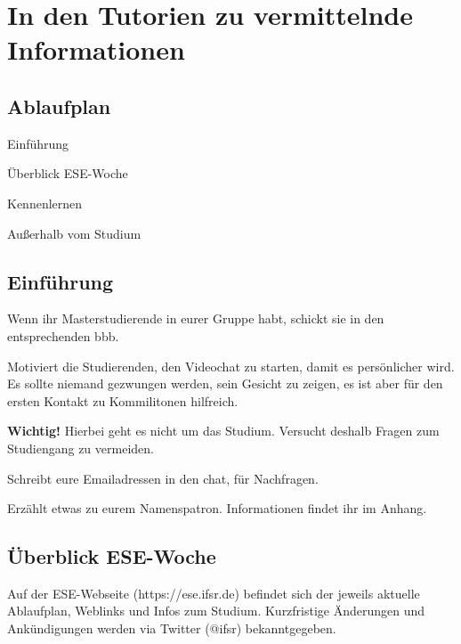 \documentclass[a4paper,12pt]{scrreprt}
\begin{document}
\chapter{In den Tutorien zu vermittelnde Informationen}

\section{Ablaufplan}

\begin{itemize*}
    \item Einführung
    \item Überblick ESE-Woche
    \item Kennenlernen
    \item Außerhalb vom Studium
\end{itemize*}

\section{Einführung}
\begin{itemize*}
    \item Wenn ihr Masterstudierende in eurer Gruppe habt, schickt sie in den entsprechenden bbb.
    \item Motiviert die Studierenden, den Videochat zu starten, damit es persönlicher wird. Es sollte niemand gezwungen werden, sein Gesicht zu zeigen, es ist aber für den ersten Kontakt zu Kommilitonen hilfreich.
    \item \textbf{Wichtig!} Hierbei geht es nicht um das Studium. Versucht deshalb Fragen zum Studiengang zu vermeiden.
    \item Schreibt eure Emailadressen in den chat, für Nachfragen.
    \item Erzählt etwas zu eurem Namenspatron. Informationen findet ihr im Anhang.
\end{itemize*}



\section{Überblick ESE-Woche}

\begin{framed}
Auf der ESE-Webseite (https://ese.ifsr.de) befindet sich der jeweils aktuelle Ablaufplan, Weblinks und Infos zum Studium. Kurzfristige Änderungen und Ankündigungen werden via Twitter (@ifsr) bekanntgegeben.
\end{framed}
\end{document}

